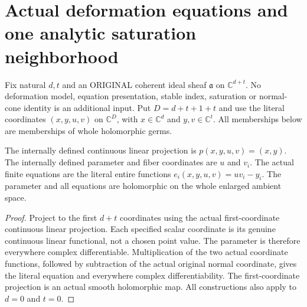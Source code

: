 \section{Actual deformation equations and one analytic saturation neighborhood}
Fix natural $d,t$ and an ORIGINAL coherent ideal sheaf $\mathfrak a$ on
$\mathbb C^{d+t}$. No deformation model, equation presentation, stable
index, saturation or normal-cone identity is an additional input. Put
$D=d+t+1+t$ and use the literal coordinates $(x,y,u,v)$ on
$\mathbb C^D$, with $x\in\mathbb C^d$ and $y,v\in\mathbb C^t$.
All memberships below are memberships of whole holomorphic germs.

\begin{theorem}
\label{hir:relative-normal-deformation-equations}
\leanok
{}
The internally defined continuous linear projection is
$p(x,y,u,v)=(x,y)$. The internally defined parameter and fiber coordinates
are $u$ and $v_i$. The actual finite equations are the literal entire
functions $e_i(x,y,u,v)=uv_i-y_i$. The parameter and all equations are
holomorphic on the whole enlarged ambient space.
\end{theorem}
\begin{proof}
Project to the first $d+t$ coordinates using the actual first-coordinate
continuous linear projection. Each specified scalar coordinate is its
genuine continuous linear functional, not a chosen point value. The parameter
is therefore everywhere complex differentiable. Multiplication of the two
actual coordinate functions, followed by subtraction of the actual original
normal coordinate, gives the literal equation and everywhere complex
differentiability. The first-coordinate projection is an actual smooth
holomorphic map. All constructions also apply to $d=0$ and $t=0$.
\end{proof}

